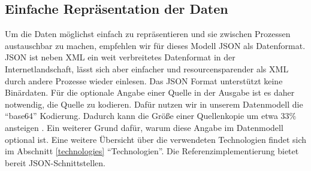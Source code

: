 \subsection{Einfache Repräsentation der Daten}
Um die Daten möglichst einfach zu repräsentieren und sie zwischen Prozessen austauschbar zu machen, empfehlen wir für dieses Modell JSON als Datenformat. JSON ist neben XML ein weit verbreitetes Datenformat in der Internetlandschaft, lässt sich aber einfacher und resourcensparender als XML durch andere Prozesse wieder einlesen. Das JSON Format unterstützt keine Binärdaten. Für die optionale Angabe einer Quelle in der Ausgabe ist es daher notwendig, die Quelle zu kodieren. Dafür nutzen wir in unserem Datenmodell die ``base64'' Kodierung. Dadurch kann die Größe einer Quellenkopie um etwa $33\%$ ansteigen \cite{ng2005study}. Ein weiterer Grund dafür, warum diese Angabe im Datenmodell optional ist. Eine weitere Übersicht über die verwendeten Technologien findet sich im Abschnitt \ref{technologies} ``Technologien''. Die Referenzimplementierung bietet bereit JSON-Schnittstellen.
